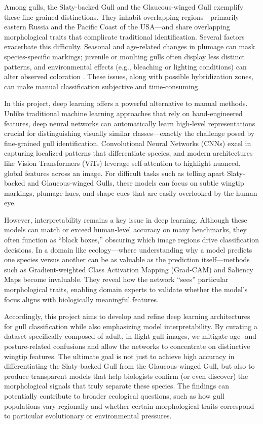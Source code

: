 Among gulls, the Slaty-backed Gull and the Glaucous-winged Gull exemplify these fine-grained distinctions. They inhabit overlapping regions—primarily eastern Russia and the Pacific Coast of the USA—and share overlapping morphological traits that complicate traditional identification. Several factors exacerbate this difficulty. Seasonal and age-related changes in plumage can mask species-specific markings; juvenile or moulting gulls often display less distinct patterns, and environmental effects (e.g., bleaching or lighting conditions) can alter observed coloration \citep{gull_variation}. These issues, along with possible hybridization zones, can make manual classification subjective and time-consuming.

In this project, deep learning offers a powerful alternative to manual methods. Unlike traditional machine learning approaches that rely on hand-engineered features, deep neural networks can automatically learn high-level representations crucial for distinguishing visually similar classes—exactly the challenge posed by fine-grained gull identification. Convolutional Neural Networks (CNNs) excel in capturing localized patterns that differentiate species, and modern architectures like Vision Transformers (ViTs) leverage self-attention to highlight nuanced, global features across an image. For difficult tasks such as telling apart Slaty-backed and Glaucous-winged Gulls, these models can focus on subtle wingtip markings, plumage hues, and shape cues that are easily overlooked by the human eye.

However, interpretability remains a key issue in deep learning. Although these models can match or exceed human-level accuracy on many benchmarks, they often function as ``black boxes,'' obscuring which image regions drive classification decisions. In a domain like ecology—where understanding why a model predicts one species versus another can be as valuable as the prediction itself—methods such as Gradient-weighted Class Activation Mapping (Grad-CAM) and Saliency Maps become invaluable. They reveal how the network ``sees'' particular morphological traits, enabling domain experts to validate whether the model's focus aligns with biologically meaningful features.

Accordingly, this project aims to develop and refine deep learning architectures for gull classification while also emphasizing model interpretability. By curating a dataset specifically composed of adult, in-flight gull images, we mitigate age- and posture-related confusions and allow the networks to concentrate on distinctive wingtip features. The ultimate goal is not just to achieve high accuracy in differentiating the Slaty-backed Gull from the Glaucous-winged Gull, but also to produce transparent models that help biologists confirm (or even discover) the morphological signals that truly separate these species. The findings can potentially contribute to broader ecological questions, such as how gull populations vary regionally and whether certain morphological traits correspond to particular evolutionary or environmental pressures.
